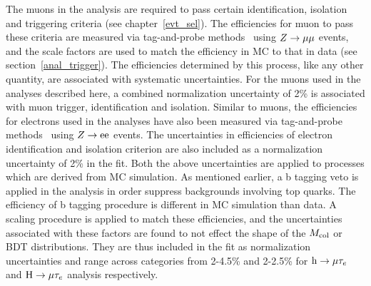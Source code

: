 The muons in the analysis are required to pass certain identification, isolation and triggering criteria (see chapter~\ref{evt_sel}). The efficiencies for muon to pass these criteria are measured via tag-and-probe methods~\cite{muon_recon2018} using $Z\rightarrow\mu\mu$ events, and the scale factors are used to match the efficiency in MC to that in data (see section~\ref{anal_trigger}). The efficiencies determined by this process, like any other quantity, are associated with systematic  uncertainties. For the muons used in the analyses described here, a combined normalization uncertainty of 2\% is associated with muon trigger, identification and isolation. Similar to muons, the efficiencies for electrons used in the analyses have also been measured via tag-and-probe methods~\cite{e_recon} using $Z\rightarrow\text{e}\text{e}$ events. The uncertainties in efficiencies  of electron identification and isolation criterion are also included as a normalization uncertainty of 2\% in the fit. Both the above uncertainties are applied to processes which are derived from MC simulation. As mentioned earlier, a b tagging veto is applied in the analysis in order suppress backgrounds involving top quarks. The efficiency of b tagging procedure is different in MC simulation than data. A scaling procedure is applied to match these efficiencies, and the uncertainties associated with these factors are found to not effect the shape of the $M_{\text{col}}$ or BDT distributions. They are thus included in the fit as normalization uncertainties and range across categories from 2-4.5\% and 2-2.5\% for $\text{h} \to \mu \tau_{e}$ and $\text{H} \to \mu \tau_{e}$ analysis respectively.


